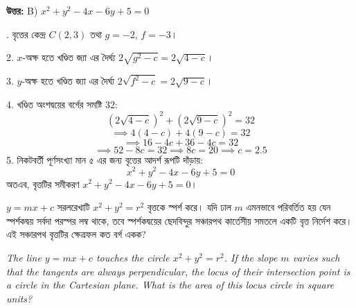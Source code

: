 \documentclass[12pt, a4paper]{article}
\begin{document}
\vspace{0.5em}
\begin{tcolorbox}[answerbox]
    \textbf{\color{success} উত্তর:} B) $x^2 + y^2 - 4x - 6y + 5 = 0$
\end{tcolorbox}
\vspace{1em}

\begin{tcolorbox}[solutionbox={সমাধান (Solution)}]
    . বৃত্তের কেন্দ্র $C(2, 3)$ তথা $g = -2$, $f = -3$।
    
    2. $x$-অক্ষ হতে খণ্ডিত জ্যা এর দৈর্ঘ্য $2\sqrt{g^2 - c} = 2\sqrt{4 - c}$।
    
    \vspace{0.5em}
    3. $y$-অক্ষ হতে খণ্ডিত জ্যা এর দৈর্ঘ্য $2\sqrt{f^2 - c} = 2\sqrt{9 - c}$।
    
    4. খণ্ডিত অংশদ্বয়ের বর্গের সমষ্টি $32$:
    \[ \left(2\sqrt{4 - c}\right)^2 + \left(2\sqrt{9 - c}\right)^2 = 32 \]
    \[ \implies 4(4 - c) + 4(9 - c) = 32 \]
    \[ \implies 16 - 4c + 36 - 4c = 32 \]
    \[ \implies 52 - 8c = 32 \implies 8c = 20 \implies c = 2.5 \]
    5. নিকটবর্তী পূর্ণসংখ্যা মান ৫ এর জন্য বৃত্তের আদর্শ রূপটি দাঁড়ায়:
    \[ x^2 + y^2 - 4x - 6y + 5 = 0 \]
    অতএব, বৃত্তটির সমীকরণ $x^2 + y^2 - 4x - 6y + 5 = 0$।
\end{tcolorbox}
\begin{tcolorbox}[questionbox={প্রশ্ন (Question) 30}]
    \noindent
    $y = mx + c$ সরলরেখাটি $x^2 + y^2 = r^2$ বৃত্তকে স্পর্শ করে। যদি ঢাল $m$ এমনভাবে পরিবর্তিত হয় যেন স্পর্শকদ্বয় সর্বদা পরস্পর লম্ব থাকে, তবে স্পর্শকদ্বয়ের ছেদবিন্দুর সঞ্চারপথ কার্তেসীয় সমতলে একটি বৃত্ত নির্দেশ করে। এই সঞ্চারপথ বৃত্তটির ক্ষেত্রফল কত বর্গ একক?
    
    \vspace{0.8em}
    \begin{english}
    \noindent\textit{\color{darkgray}
    The line $y = mx + c$ touches the circle $x^2 + y^2 = r^2$. If the slope $m$ varies such that the tangents are always perpendicular, the locus of their intersection point is a circle in the Cartesian plane. What is the area of this locus circle in square units?
    }
    \end{english}
\end{tcolorbox}
\end{document}

